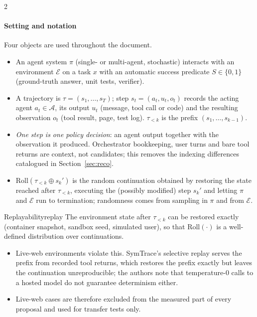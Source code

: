 \begin{multicols}{2}
\paragraph{Setting and notation} Four objects are used throughout the document.
\begin{itemize}[leftmargin=1.1em]
\item An agent system $\pi$ (single- or multi-agent, stochastic) interacts with an environment $\mathcal{E}$ on a task $x$ with an automatic success predicate $S\in\{0,1\}$ (ground-truth answer, unit tests, verifier).
\item A trajectory is $\tau=(s_1,\dots,s_T)$; step $s_t=(a_t,u_t,o_t)$ records the acting agent $a_t\in\mathcal{A}$, its output $u_t$ (message, tool call or code) and the resulting observation $o_t$ (tool result, page, test log). $\tau_{<k}$ is the prefix $(s_1,\dots,s_{k-1})$.
\item \emph{One step is one policy decision}: an agent output together with the observation it produced. Orchestrator bookkeeping, user turns and bare tool returns are context, not candidates; this removes the indexing differences catalogued in Section~\ref{sec:reco}.
\item $\mathrm{Roll}(\tau_{<k}\oplus s_k')$ is the random continuation obtained by restoring the state reached after $\tau_{<k}$, executing the (possibly modified) step $s_k'$ and letting $\pi$ and $\mathcal{E}$ run to termination; randomness comes from sampling in $\pi$ and from $\mathcal{E}$.
\end{itemize}

\begin{assumption}{Replayability}{replay}
The environment state after $\tau_{<k}$ can be restored exactly (container snapshot, sandbox seed, simulated user), so that $\mathrm{Roll}(\cdot)$ is a well-defined distribution over continuations.
\begin{itemize}[leftmargin=1.1em]
\item Live-web environments violate this. SymTrace's selective replay \cite{luan2026symtrace} serves the prefix from recorded tool returns, which restores the prefix exactly but leaves the continuation unreproducible; the authors note that temperature-0 calls to a hosted model do not guarantee determinism either.
\item Live-web cases are therefore excluded from the measured part of every proposal and used for transfer tests only.
\end{itemize}
\end{assumption}


\end{multicols}

